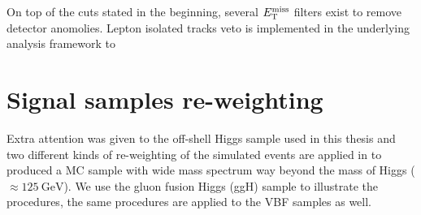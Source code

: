 On top of the cuts stated in the beginning, several $E_{\mathrm{T}}^{\mathrm{miss}}$ filters exist to remove detector 
anomolies. Lepton isolated tracks veto is implemented
in the underlying analysis framework to 

\section{Signal samples re-weighting}
\label{sec:sig_rewgt}
Extra attention was given to the off-shell Higgs sample used in this thesis and two different kinds
of re-weighting of the simulated events are applied in to produced a MC sample with wide
mass spectrum way beyond the mass of Higgs ($\approx \SI{125}{\giga\electronvolt}$). We use the
gluon fusion Higgs (ggH) sample to illustrate the procedures, the same procedures are applied to
the VBF samples as well.

